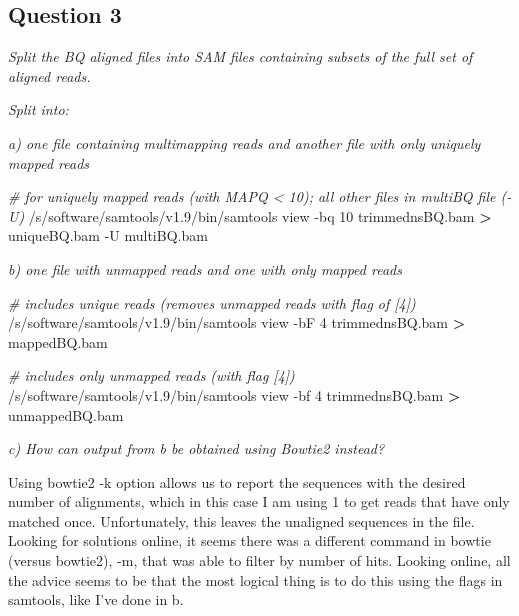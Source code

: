 \documentclass[]{article}
\newenvironment{Shaded}{\begin{snugshade}}{\end{snugshade}}
\newcommand{\CommentTok}[1]{\textcolor[rgb]{0.56,0.35,0.01}{\textit{#1}}}
\newcommand{\VariableTok}[1]{\textcolor[rgb]{0.00,0.00,0.00}{#1}}
\newcommand{\OperatorTok}[1]{\textcolor[rgb]{0.81,0.36,0.00}{\textbf{#1}}}
\newcommand{\BuiltInTok}[1]{#1}
\newcommand{\ExtensionTok}[1]{#1}
\newcommand{\NormalTok}[1]{#1}
\begin{document}
\subsection{Question 3}\label{question-3}

\emph{Split the BQ aligned files into SAM files containing subsets of
the full set of aligned reads.}

\emph{Split into:}

\emph{a) one file containing multimapping reads and another file with
only uniquely mapped reads}

\begin{Shaded}
\begin{Highlighting}[]
\CommentTok{# for uniquely mapped reads (with MAPQ < 10); all other files in multiBQ file (-U)}
\ExtensionTok{/s/software/samtools/v1.9/bin/samtools}\NormalTok{ view -bq 10 trimmednsBQ.bam }\OperatorTok{>}\NormalTok{ uniqueBQ.bam -U multiBQ.bam}
\end{Highlighting}
\end{Shaded}

\emph{b) one file with unmapped reads and one with only mapped reads}

\begin{Shaded}
\begin{Highlighting}[]
\CommentTok{# includes unique reads (removes unmapped reads with flag of [4])}
\ExtensionTok{/s/software/samtools/v1.9/bin/samtools}\NormalTok{ view -bF 4 trimmednsBQ.bam }\OperatorTok{>}\NormalTok{ mappedBQ.bam}

\CommentTok{# includes only unmapped reads (with flag [4])}
\ExtensionTok{/s/software/samtools/v1.9/bin/samtools}\NormalTok{ view -bf 4 trimmednsBQ.bam }\OperatorTok{>}\NormalTok{ unmappedBQ.bam}
\end{Highlighting}
\end{Shaded}

\emph{c) How can output from b be obtained using Bowtie2 instead?}

Using bowtie2 -k option allows us to report the sequences with the
desired number of alignments, which in this case I am using 1 to get
reads that have only matched once. Unfortunately, this leaves the
unaligned sequences in the file. Looking for solutions online, it seems
there was a different command in bowtie (versus bowtie2), -m, that was
able to filter by number of hits. Looking online, all the advice seems
to be that the most logical thing is to do this using the flags in
samtools, like I've done in b.

\begin{Shaded}
\end{Shaded}
\end{document}
